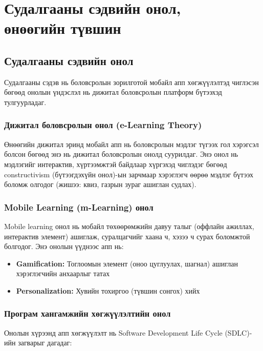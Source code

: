 \setlength{\headheight}{27pt}
\newpage
\pagestyle{plain}
\chapter{Судалгааны сэдвийн онол,\\ өнөөгийн түвшин}

\section{Судалгааны сэдвийн онол}

Судалгааны сэдэв нь боловсролын зорилготой мобайл апп хөгжүүлэлтэд чиглэсэн бөгөөд онолын үндэслэл нь дижитал боловсролын платформ бүтээхэд тулгуурладаг.

\subsection{Дижитал боловсролын онол (e-Learning Theory)}

Өнөөгийн дижитал эринд мобайл апп нь боловсролын мэдлэг түгээх гол хэрэгсэл болсон бөгөөд энэ нь дижитал боловсролын онолд суурилдаг. Энэ онол нь мэдлэгийг интерактив, хүртээмжтэй байдлаар хүргэхэд чиглэдэг бөгөөд constructivism (бүтээгдэхүйн онол)-ын зарчмаар хэрэглэгч өөрөө мэдлэг бүтээх боломж олгодог (жишээ: квиз, газрын зураг ашиглан судлах).

\subsection{Mobile Learning (m-Learning) онол}

Mobile learning онол нь мобайл төхөөрөмжийн давуу талыг (оффлайн ажиллах, интерактив элемент) ашиглаж, суралцагчийг хаана ч, хэзээ ч сурах боломжтой болгодог. Энэ онолын үүднээс апп нь:

\begin{itemize}
	\item \textbf{Gamification:} Тоглоомын элемент (оноо цуглуулах, шагнал) ашиглан хэрэглэгчийн анхаарлыг татах
	\item \textbf{Personalization:} Хувийн тохиргоо (түвшин сонгох) хийх
\end{itemize}

\subsection{Програм хангамжийн хөгжүүлэлтийн онол}

Онолын хүрээнд апп хөгжүүлэлт нь Software Development Life Cycle (SDLC)-ийн загварыг дагадаг:

